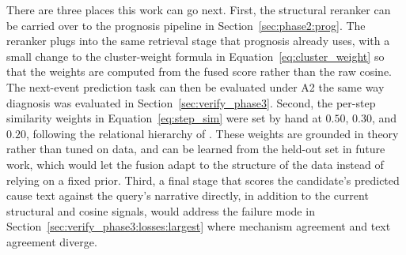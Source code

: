 \documentclass[11pt]{article}
\begin{document}
There are three places this work can go next. First, the structural reranker can be carried over to the prognosis pipeline in Section~\ref{sec:phase2:prog}. The reranker plugs into the same retrieval stage that prognosis already uses, with a small change to the cluster-weight formula in Equation~\ref{eq:cluster_weight} so that the weights are computed from the fused score rather than the raw cosine. The next-event prediction task can then be evaluated under A2 the same way diagnosis was evaluated in Section~\ref{sec:verify_phase3}. Second, the per-step similarity weights in Equation~\ref{eq:step_sim} were set by hand at $0.50$, $0.30$, and $0.20$, following the relational hierarchy of \citet{Gentner1983}. These weights are grounded in theory rather than tuned on data, and can be learned from the held-out set in future work, which would let the fusion adapt to the structure of the data instead of relying on a fixed prior. Third, a final stage that scores the candidate's predicted cause text against the query's narrative directly, in addition to the current structural and cosine signals, would address the failure mode in Section~\ref{sec:verify_phase3:losses:largest} where mechanism agreement and text agreement diverge.
\end{document}
